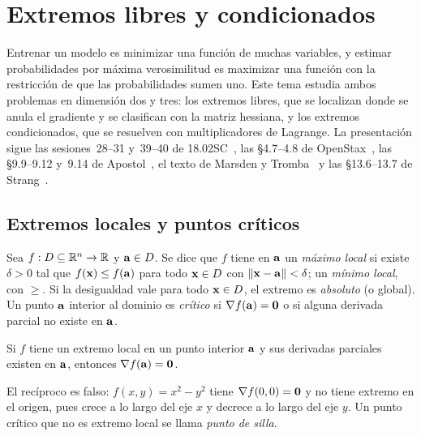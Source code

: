 \chapter{Extremos libres y condicionados}
\label{tema:5}

Entrenar un modelo es minimizar una función de muchas variables, y estimar probabilidades por máxima verosimilitud es maximizar una función con la restricción de que las probabilidades sumen uno. Este tema estudia ambos problemas en dimensión dos y tres: los extremos libres, que se localizan donde se anula el gradiente y se clasifican con la matriz hessiana, y los extremos condicionados, que se resuelven con multiplicadores de Lagrange. La presentación sigue las sesiones~28--31 y~39--40 de 18.02SC~\cite{mit1802}, las §4.7--4.8 de OpenStax~\cite{openstax3}, las §9.9--9.12 y~9.14 de Apostol~\cite{apostol2}, el texto de Marsden y Tromba~\cite{marsden} y las §13.6--13.7 de Strang~\cite{strangcalc}.

\section{Extremos locales y puntos críticos}

\begin{definicion}[Extremos]\label{def:extremos}
Sea $f:D\subseteq\mathbb{R}^n\to\mathbb{R}$ y $\mathbf{a}\in D$. Se dice que $f$ tiene en $\mathbf{a}$ un \emph{máximo local} si existe $\delta>0$ tal que $f(\mathbf{x})\le f(\mathbf{a})$ para todo $\mathbf{x}\in D$ con $\lVert\mathbf{x}-\mathbf{a}\rVert<\delta$; un \emph{mínimo local}, con $\ge$. Si la desigualdad vale para todo $\mathbf{x}\in D$, el extremo es \emph{absoluto} (o global). Un punto $\mathbf{a}$ interior al dominio es \emph{crítico} si $\nabla f(\mathbf{a})=\mathbf{0}$ o si alguna derivada parcial no existe en $\mathbf{a}$.
\end{definicion}

\begin{teorema}\label{teo:fermat}
Si $f$ tiene un extremo local en un punto interior $\mathbf{a}$ y sus derivadas parciales existen en $\mathbf{a}$, entonces $\nabla f(\mathbf{a})=\mathbf{0}$.
\end{teorema}

El recíproco es falso: $f(x,y)=x^2-y^2$ tiene $\nabla f(0,0)=\mathbf{0}$ y no tiene extremo en el origen, pues crece a lo largo del eje $x$ y decrece a lo largo del eje $y$. Un punto crítico que no es extremo local se llama \emph{punto de silla}.

